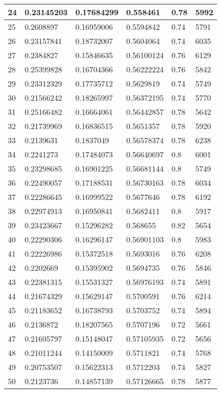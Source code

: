 \begin{longtable}{|l|l|l|l|l|l|}
24 & 0.23145203 & 0.17684299 & 0.558461 & 0.78 & 5992 \\ \hline 
25 & 0.2608897 & 0.16959006 & 0.5594842 & 0.74 & 5791 \\ \hline 
26 & 0.23157841 & 0.18732007 & 0.5604064 & 0.74 & 6035 \\ \hline 
27 & 0.2384827 & 0.15846635 & 0.56100124 & 0.76 & 6129 \\ \hline 
28 & 0.25399828 & 0.16704366 & 0.56222224 & 0.76 & 5842 \\ \hline 
29 & 0.23312329 & 0.17735712 & 0.5629819 & 0.74 & 5749 \\ \hline 
30 & 0.21566242 & 0.18265997 & 0.56372195 & 0.74 & 5770 \\ \hline 
31 & 0.25166482 & 0.16664061 & 0.56442857 & 0.78 & 5642 \\ \hline 
32 & 0.21739969 & 0.16836515 & 0.5651357 & 0.78 & 5920 \\ \hline 
33 & 0.2139631 & 0.1837049 & 0.56578374 & 0.78 & 6238 \\ \hline 
34 & 0.2241273 & 0.17484073 & 0.56640697 & 0.8 & 6001 \\ \hline 
35 & 0.23298685 & 0.16901225 & 0.56681144 & 0.8 & 5749 \\ \hline 
36 & 0.22490057 & 0.17188531 & 0.56730163 & 0.78 & 6034 \\ \hline 
37 & 0.22286645 & 0.16999522 & 0.5677646 & 0.78 & 6192 \\ \hline 
38 & 0.22974913 & 0.16950841 & 0.5682411 & 0.8 & 5917 \\ \hline 
39 & 0.23423667 & 0.15296282 & 0.568655 & 0.82 & 5654 \\ \hline 
40 & 0.22290306 & 0.16296147 & 0.56901103 & 0.8 & 5983 \\ \hline 
41 & 0.22226986 & 0.15372518 & 0.5693016 & 0.76 & 6208 \\ \hline 
42 & 0.2202669 & 0.15395902 & 0.5694735 & 0.76 & 5846 \\ \hline 
43 & 0.22381315 & 0.15531327 & 0.56976193 & 0.74 & 5891 \\ \hline 
44 & 0.21674329 & 0.15629147 & 0.5700591 & 0.76 & 6214 \\ \hline 
45 & 0.21183652 & 0.16738793 & 0.5703752 & 0.74 & 5894 \\ \hline 
46 & 0.2136872 & 0.18207565 & 0.5707196 & 0.72 & 5661 \\ \hline 
47 & 0.21605797 & 0.15148047 & 0.57105935 & 0.72 & 5656 \\ \hline 
48 & 0.21011244 & 0.14150009 & 0.5711821 & 0.74 & 5768 \\ \hline 
49 & 0.20753507 & 0.15622313 & 0.5712203 & 0.74 & 5827 \\ \hline 
50 & 0.2123736 & 0.14857139 & 0.57126665 & 0.78 & 5877 \\ \hline 
\end{longtable}